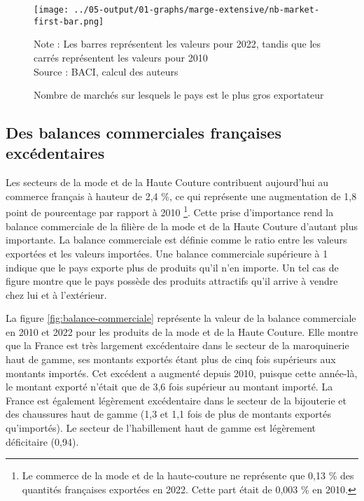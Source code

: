 \documentclass[french,10pt,a4paper]{article}
\begin{document}
\begin{figure}[!h]
  \centering  \texttt{[image: ../05-output/01-graphs/marge-extensive/nb-market-first-bar.png]}
  \captionsetup{justification=justified, singlelinecheck=false, font=small}
  \caption*{Note : Les barres représentent les valeurs pour 2022, tandis que les carrés représentent les valeurs pour 2010 \\
  Source : BACI, calcul des auteurs}
  \captionsetup{justification=centering, singlelinecheck=true, font=normalsize}
  \caption{Nombre de marchés sur lesquels le pays est le plus gros exportateur}
  \label{fig:nb-market-first-bar}
\end{figure}


\subsection{Des balances commerciales françaises excédentaires}
Les secteurs de la mode et de la Haute Couture contribuent aujourd'hui au commerce français à hauteur de 2,4 \%, ce qui représente une augmentation de 1,8 point de pourcentage par rapport à 2010 \footnote{Le commerce de la mode et de la haute-couture ne représente que 0,13 \% des quantités françaises exportées en 2022. Cette part était de 0,003 \% en 2010.}. Cette prise d'importance rend la balance commerciale de la filière de la mode et de la Haute Couture d'autant plus importante. La balance commerciale est définie comme le ratio entre les valeurs exportées et les valeurs importées. Une balance commerciale supérieure à 1 indique que le pays exporte plus de produits qu'il n'en importe. Un tel cas de figure montre que le pays possède des produits attractifs qu'il arrive à vendre chez lui et à l'extérieur.

\bigskip

La figure \ref{fig:balance-commerciale} représente la valeur de la balance commerciale en 2010 et 2022 pour les produits de la mode et de la Haute Couture. Elle montre que la France est très largement excédentaire dans le secteur de la maroquinerie haut de gamme, ses montants exportés étant plus de cinq fois supérieurs aux montants importés. Cet excédent a augmenté depuis 2010, puisque cette année-là, le montant exporté n'était que de 3,6 fois supérieur au montant importé. La France est également légèrement excédentaire dans le secteur de la bijouterie et des chaussures haut de gamme (1,3 et 1,1 fois de plus de montants exportés qu'importés). Le secteur de l'habillement haut de gamme est légèrement déficitaire (0,94).
\end{document}
